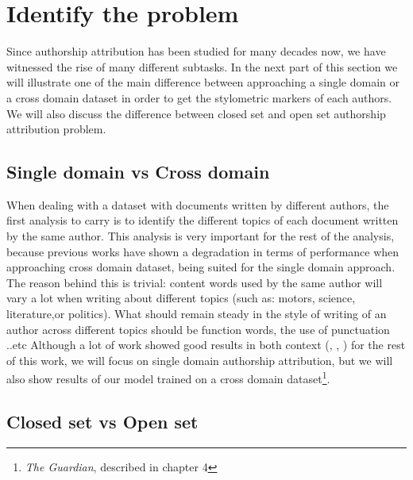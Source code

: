 \section{Identify the problem}

Since authorship attribution has been studied for many decades now, we have witnessed the rise of many different subtasks. In the next part of this section we will illustrate one of the main difference between approaching a single domain or a cross domain dataset in order to get the stylometric markers of each authors.
We will also discuss the difference between closed set and open set authorship attribution problem.

\subsection{Single domain vs Cross domain}

When dealing with a dataset with documents written by different authors, the first analysis to carry is to identify the different topics of each document written by the same author. This analysis is very important for the rest of the analysis, because previous works have shown a degradation in terms of performance when approaching cross domain dataset, being suited for the single domain approach.
The reason behind this is trivial: content words used by the same author will vary a lot when writing about different topics (such as: motors, science, literature,or politics). What should remain steady in the style of writing of an author across different topics should be function words, the use of punctuation ..etc
Although a lot of work showed good results in both context (\cite{sapkota2015not}, \cite{kestemont2019overview}, \cite{overdorf2016blogs}) for the rest of this work, we will focus on single domain authorship attribution, but we will also show results of our model trained on a cross domain dataset\footnote{\textit{The Guardian}, described in chapter 4}. 

\subsection{Closed set vs Open set}

